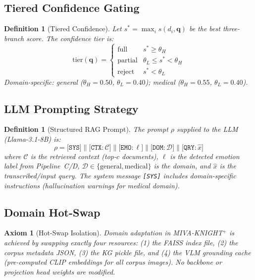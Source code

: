 \documentclass[10pt,conference]{IEEEtran}
\theoremstyle{ieeethm}
\theoremstyle{ieeedef}
\newtheorem{definition}[theorem]{Definition}
\newtheorem{axiom}{Axiom}
\theoremstyle{ieeeremark}
\begin{document}
\subsection{Tiered Confidence Gating}

\begin{definition}[Tiered Confidence]
\label{def:confidence}
Let $s^* = \max_i s(d_i, \mathbf{q})$ be the best three-branch score. The confidence tier is:
\begin{equation}
\text{tier}(\mathbf{q}) = \begin{cases}
  \text{full}    & s^* \geq \theta_H \\
  \text{partial} & \theta_L \leq s^* < \theta_H \\
  \text{reject}  & s^* < \theta_L
\end{cases}
\label{eq:tier}
\end{equation}
Domain-specific: general ($\theta_H{=}0.50$, $\theta_L{=}0.40$); medical ($\theta_H{=}0.55$, $\theta_L{=}0.40$).
\end{definition}

\subsection{LLM Prompting Strategy}

\begin{definition}[Structured RAG Prompt]
\label{def:prompt}
The prompt $\rho$ supplied to the LLM (Llama-3.1-8B) is:
\begin{equation}
\rho = \texttt{[SYS]} \| \texttt{[CTX:}\,\mathcal{C}\texttt{]} \| \texttt{[EMO:}\,\ell\texttt{]} \| \texttt{[DOM:}\,\mathcal{D}\texttt{]} \| \texttt{[QRY:}\,\hat{x}\texttt{]}
\label{eq:prompt}
\end{equation}
where $\mathcal{C}$ is the retrieved context (top-$c$ documents), $\ell$ is the detected emotion label from Pipeline~C/D, $\mathcal{D} \in \{\text{general}, \text{medical}\}$ is the domain, and $\hat{x}$ is the transcribed/input query. The system message \texttt{[SYS]} includes domain-specific instructions (hallucination warnings for medical domain).
\end{definition}

\subsection{Domain Hot-Swap}

\begin{axiom}[Hot-Swap Isolation]
\label{ax:hotswap}
Domain adaptation in MIVA-KNIGHT$^+$ is achieved by swapping exactly four resources: (1) the FAISS index file, (2) the corpus metadata JSON, (3) the KG pickle file, and (4) the VLM grounding cache (pre-computed CLIP embeddings for all corpus images). No backbone or projection head weights are modified.
\end{axiom}
\end{document}
